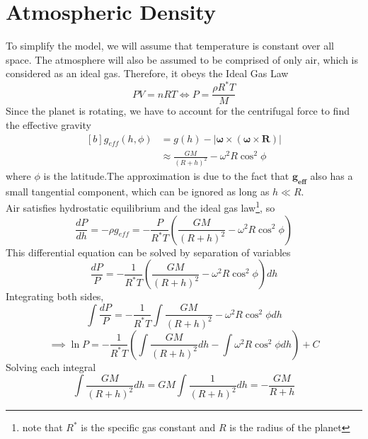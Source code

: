 \documentclass[12pt]{article}
\newcommand{\bs}[1]{\boldsymbol{#1}}
\newcommand{\om}{\omega}
\begin{document}
\section{Atmospheric Density}
To simplify the model, we will assume that temperature is constant over all space. The atmosphere will also be assumed to be comprised of only air, which is considered as an ideal gas. Therefore, it obeys the Ideal Gas Law
\begin{equation}
PV=nRT \iff P=\frac{\rho R^*T}{M}
\end{equation}
Since the planet is rotating, we have to account for the centrifugal force to find the effective gravity
\begin{equation}
\begin{aligned}[b]
g_{eff}\left(h, \phi\right) &= g\left(h\right) - |\bs{\om} \times \left(\bs{\om} \times \bs{R}\right)|\\
&\approx \frac{GM}{\left(R+h\right)^2} - \om^2R\cos^2\phi
\end{aligned}
\end{equation}
where $\phi$ is the latitude.The approximation is due to the fact that $\bs{g_{eff}}$ also has a small tangential component, which can be ignored as long as $h \ll R$.\\
Air satisfies hydrostatic equilibrium and the ideal gas law\footnote{note that $R^*$ is the specific gas constant and $R$ is the radius of the planet}, so
\begin{equation}
\frac{dP}{dh} = -\rho g_{eff} = -\frac{P}{R^*T}\left(\frac{GM}{\left(R+h\right)^2} - \om^2R\cos^2\phi\right)
\end{equation}
This differential equation can be solved by separation of variables
\begin{equation*}
\frac{dP}{P} = -\frac{1}{R^*T}\left(\frac{GM}{\left(R+h\right)^2} - \om^2R\cos^2\phi\right) dh
\end{equation*}
Integrating both sides,
\begin{equation*}
\int \frac{dP}{P} = -\frac{1}{R^*T}\int \frac{GM}{\left(R+h\right)^2} -\om^2R\cos^2\phi dh
\end{equation*}
\begin{equation*}
\implies \ln{P} = -\frac{1}{R^*T} \left(\int \frac{GM}{\left(R+h\right)^2} dh - \int \om^2R\cos^2\phi dh\right) + C
\end{equation*}
Solving each integral
\begin{equation*}
\int \frac{GM}{\left(R+h\right)^2} dh = GM \int \frac{1}{\left(R+h\right)^2} dh = -\frac{GM}{R+h}
\end{equation*}
\end{document}
